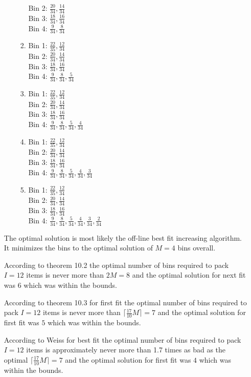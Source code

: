 \documentclass[11pt]{article}
\begin{document}
\begin{enumerate}
\begin{enumerate}
\begin{enumerate}
Bin 2: $\frac{20}{34}, \frac{14}{34}$\\
Bin 3: $\frac{18}{34}, \frac{16}{34}$\\
Bin 4: $\frac{9}{34}, \frac{8}{34}$
\item Bin 1: $\frac{22}{35}, \frac{12}{34}$\\
Bin 2: $\frac{20}{34}, \frac{14}{34}$\\
Bin 3: $\frac{18}{34}, \frac{16}{34}$\\
Bin 4: $\frac{9}{34}, \frac{8}{34}, \frac{5}{34}$
\item Bin 1: $\frac{22}{35}, \frac{12}{34}$\\
Bin 2: $\frac{20}{34}, \frac{14}{34}$\\
Bin 3: $\frac{18}{34}, \frac{16}{34}$\\
Bin 4: $\frac{9}{34}, \frac{8}{34}, \frac{5}{34}, \frac{4}{34}$
\item Bin 1: $\frac{22}{35}, \frac{12}{34}$\\
Bin 2: $\frac{20}{34}, \frac{14}{34}$\\
Bin 3: $\frac{18}{34}, \frac{16}{34}$\\
Bin 4: $\frac{9}{34}, \frac{8}{34}, \frac{5}{34}, \frac{4}{34}, \frac{3}{34}$
\item Bin 1: $\frac{22}{35}, \frac{12}{34}$\\
Bin 2: $\frac{20}{34}, \frac{14}{34}$\\
Bin 3: $\frac{18}{34}, \frac{16}{34}$\\
Bin 4: $\frac{9}{34}, \frac{8}{34}, \frac{5}{34}, \frac{4}{34}, \frac{3}{34}, \frac{2}{34}$
\end{enumerate}
\end{enumerate}
The optimal solution is most likely the off-line best fit increasing algorithm. It minimizes the bins to the optimal solution of $M = 4$ bins overall. 

According to theorem 10.2 the optimal number of bins required to pack $I = 12$ items is never more than  $2M = 8$ and the optimal solution for next fit was $6$ which was within the bounds.

According to theorem 10.3 for first fit the optimal number of bins required to pack $I = 12$ items is never more than  $\lceil \frac{17}{10} M \rceil = 7$ and the optimal solution for first fit was $5$ which was within the bounds.

According to Weiss for best fit the optimal number of bins required to pack $I = 12$ items is approximately never more than 1.7 times as bad as the optimal $\lceil \frac{17}{10} M \rceil = 7$ and the optimal solution for first fit was $4$ which was within the bounds.


\end{enumerate}
\end{document}
